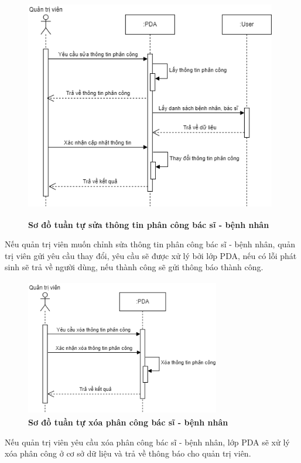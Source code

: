 \begin{figure}[H]
  \centering
  \includegraphics[width=11cm,height=10cm]{Images/sequence/sequence_manage_edit_pda.png}
  \caption[Sơ đồ tuần tự sửa thông tin phân công bác sĩ - bệnh nhân]{\bfseries \fontsize{12pt}{0pt}
  \selectfont Sơ đồ tuần tự sửa thông tin phân công bác sĩ - bệnh nhân}
  \label{sequence_manage_edit_pda} %
\end{figure}
Nếu quản trị viên muốn chỉnh sửa thông tin phân công bác sĩ - bệnh nhân, quản trị viên gửi yêu cầu thay đổi, 
yêu cầu sẽ được xử lý bởi lớp PDA, nếu có lỗi phát sinh sẽ trả về người dùng, nếu thành công sẽ gửi thông báo thành công. 
\begin{figure}[H]
  \centering
  \includegraphics[width=8.5cm,height=6cm]{Images/sequence/sequence_manage_delete_pda.png}
  \caption[Sơ đồ tuần tự xóa phân công bác sĩ - bệnh nhân]{\bfseries \fontsize{12pt}{0pt}
  \selectfont Sơ đồ tuần tự xóa phân công bác sĩ - bệnh nhân}
  \label{sequence_manage_delete_pda} %
\end{figure}
Nếu quản trị viên yêu cầu xóa phân công bác sĩ - bệnh nhân, lớp PDA sẽ xử lý xóa phân công ở cơ sở dữ liệu và trả về thông báo cho quản trị viên.

